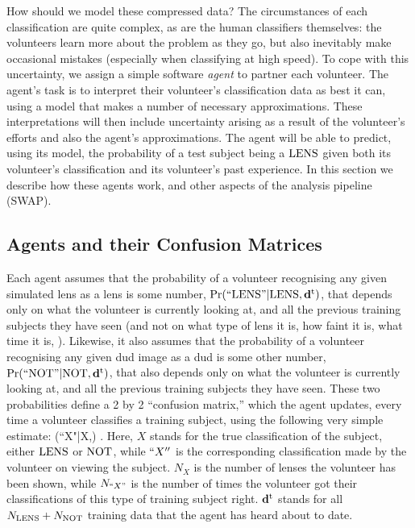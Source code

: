\documentclass[useAMS,usenatbib,a4paper]{mn2e}
\begin{document}
How should we model these compressed data? The circumstances of each
classification are quite complex, as are the human classifiers themselves: the
volunteers learn more about the problem as they go, but also inevitably make
occasional mistakes (especially when classifying at high speed).
To cope with this uncertainty, we assign a
simple software {\it agent} to partner each volunteer. The agent's task is to
interpret their volunteer's classification data as best it can, using a model
that makes a number of necessary approximations. These interpretations will
then include uncertainty arising as a result of the volunteer's efforts and
also the agent's approximations.
The agent will be able to predict, using its model, the probability of a test
subject being a ${\rm LENS}$ given both its volunteer's classification and its
volunteer's past experience. In this section we describe how these agents work,
and other aspects of the \SW analysis pipeline (SWAP).


\subsection{Agents and their Confusion Matrices}
\label{sec:swap:details:probabilities}

Each agent assumes that the probability of a volunteer recognising any given
simulated lens as a lens is some number, ${\rm Pr}({\rm ``LENS"}|{\rm LENS},{\mathbf{d}^{\rm t}})$, that
depends only on what the volunteer is currently looking at, and all the
previous training subjects they have seen (and not on what type of lens it is,
how faint it is, what time it is, \etc). Likewise, it also assumes that the
probability of a volunteer recognising any given dud image as a dud is some
other number, ${\rm Pr}({\rm ``NOT"}|{\rm NOT},{\mathbf{d}^{\rm t}})$, that also depends only on what the volunteer is currently looking at, and all the
previous training subjects they have seen. These two probabilities define a
2 by 2 ``confusion matrix,'' which the agent updates, every time a
volunteer classifies a training subject, using the following
very simple estimate:
\be
  \pr(``X"|X,\training) \approx {}.
  \label{eq:app:fraction}
\ee
Here, $X$ stands for the true classification of the subject, \ie either
${\rm LENS}$ or ${\rm NOT}$, while $``X''$ is the corresponding classification
made by the volunteer on viewing the subject. $N_X$ is the number of
lenses the volunteer has been shown, while $N_{``X"}$ is the number of
times the volunteer got their classifications of this type of training subject
right. ${\mathbf{d}^{\rm t}}$ stands for all
$N_{{\rm LENS}} + N_{{\rm NOT}}$ training data that the agent has heard about to
date.
\end{document}
